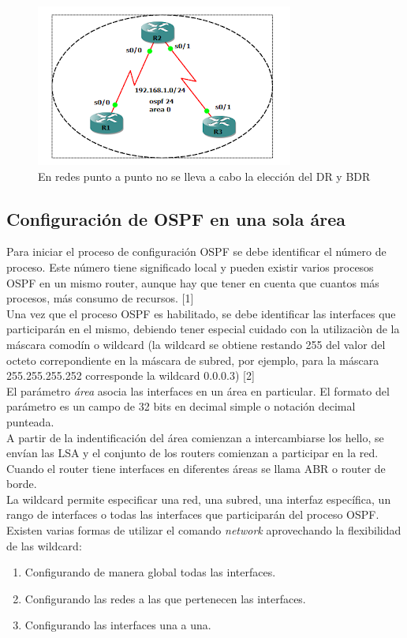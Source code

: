 \documentclass[12pt]{article}
\begin{document}
\begin{figure}[h]
\centering
\includegraphics[scale=1]{ospf_ppp.png}
\caption{En redes punto a punto no se lleva a cabo la elección del DR y BDR}
\end{figure}

\subsection{Configuración de OSPF en una sola área}
Para iniciar el proceso de configuración OSPF se debe identificar el número de proceso. Este número tiene significado local y pueden existir varios procesos OSPF en un mismo router, aunque hay que tener en cuenta que cuantos más procesos, más consumo de recursos.  [1]\\

Una vez que el proceso OSPF es habilitado, se debe identificar las interfaces que participarán en el mismo, debiendo tener especial cuidado con la utilizaciòn de la máscara comodín o wildcard (la wildcard se obtiene restando 255 del valor del octeto correpondiente en la máscara de subred, por ejemplo, para la máscara 255.255.255.252 corresponde la wildcard 0.0.0.3) [2]\\

El parámetro \textit{área} asocia las interfaces en un área en particular. El formato del parámetro es un campo de 32 bits en decimal simple o notación decimal punteada.\\

A partir de la indentificación del área comienzan a intercambiarse los hello, se envían las LSA y el conjunto de los routers comienzan a participar en la red. Cuando el router tiene interfaces en diferentes áreas se llama ABR o router de borde.\\

La wildcard permite especificar una red, una subred, una interfaz específica, un rango de interfaces o todas las interfaces que participarán del proceso OSPF. Existen varias formas de utilizar el comando \textit{network} aprovechando la flexibilidad de las wildcard:
\begin{enumerate}
\item Configurando de manera global todas las interfaces.
\item Configurando las redes a las que pertenecen las interfaces. 
\item Configurando las interfaces una a una.
\end{enumerate}
\end{document}
